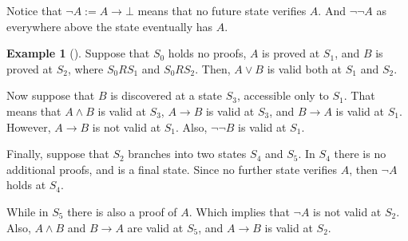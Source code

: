 \documentclass[12pt,a4paper]{article}
\theoremstyle{definition}
\newtheorem{example}{Example}[section]
\begin{document}
Notice that $\neg A := A \to \bot$ means that no future state verifies $A$. And $\neg \neg A$ as everywhere above the state eventually has $A$.

\begin{example}[]\label{possible-worlds-example}
    Suppose that $S_0$ holds no proofs, $A$ is proved at $S_1$, and $B$ is proved at $S_2$, where $S_0 R S_1$ and $S_0 R S_2$. Then, $A \lor B$ is valid both at $S_1$ and $S_2$.

    Now suppose that $B$ is discovered at a state $S_3$, accessible only to $S_1$. That means that $A \land B$ is valid at $S_3$, $A \to B$ is valid at $S_3$, and $B \to A$ is valid at $S_1$. However, $A \to B$ is not valid at $S_1$. Also, $\neg \neg B$ is valid at $S_1$.

    Finally, suppose that $S_2$ branches into two states $S_4$ and $S_5$. In $S_4$ there is no additional proofs, and is a final state. Since no further state verifies $A$, then $\neg A$ holds at $S_4$.
    
    While in $S_5$ there is also a proof of $A$. Which implies that $\neg A$ is not valid at $S_2$. Also, $A \land B$ and $B \to A$ are valid at $S_5$, and $A \to B$ is valid at $S_2$.


\end{example}
\end{document}
